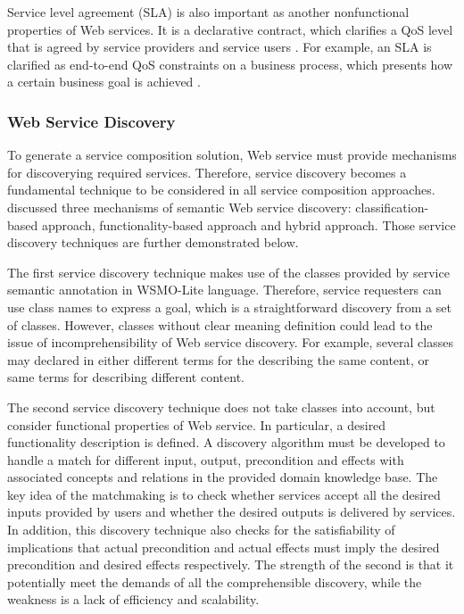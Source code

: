 Service level agreement (SLA) is also important as another nonfunctional properties of Web services. It is a declarative contract, which clarifies a QoS level that is agreed by service providers and service users \cite{zhao2015toward}. For example,  an SLA is clarified as end-to-end QoS constraints on a business process,  which presents how a certain business goal is achieved \cite{wada2008multiobjective}.

\subsubsection{Web Service Discovery}\label{servicediscovery}
To generate a service composition solution, Web service must provide mechanisms for discoverying required services. Therefore, service discovery becomes a fundamental technique to be considered in all service composition approaches. \cite{agarwal2009d5} discussed three mechanisms of semantic Web service discovery: classification-based approach, functionality-based approach and hybrid approach. Those service discovery techniques are further demonstrated below.

The first service discovery technique makes use of the classes provided by service semantic annotation in WSMO-Lite language. Therefore, service requesters can use class names to express a goal, which is a straightforward discovery from a set of classes. However, classes without clear meaning definition could lead to the issue of incomprehensibility of Web service discovery. For example, several classes may declared in either different terms for the describing the same content, or same terms for describing different content.

The second service discovery technique  does not take classes into account, but consider functional properties of Web service. In particular, a desired functionality description is defined. A discovery algorithm must be developed to handle a match for different input, output, precondition and effects with associated concepts and relations in the provided domain knowledge base. The key idea of the matchmaking is to check whether services accept all the desired inputs provided by users and whether the desired outputs is delivered by services. In addition, this discovery technique also checks for the satisfiability of implications that actual precondition and actual effects must imply the desired precondition and desired effects respectively. The strength of the second is that it potentially meet the demands of all the comprehensible discovery, while the weakness is a lack of efficiency and scalability. 

